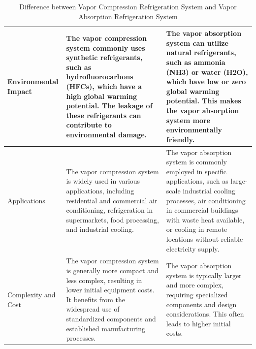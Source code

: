 \documentclass{article}
\begin{document}
\begin{table}[!htbp]
\begin{tabularx}{\linewidth}{@{}>{\hsize=0.6\hsize}X *{2}{>{\hsize=1.2\hsize}X}@{}}
    \hline 
    Environmental Impact & The vapor compression system commonly uses synthetic refrigerants, such as hydrofluorocarbons (HFCs), which have a high global warming potential. The leakage of these refrigerants can contribute to environmental damage. & The vapor absorption system can utilize natural refrigerants, such as ammonia (NH3) or water (H2O), which have low or zero global warming potential. This makes the vapor absorption system more environmentally friendly.\\
    \hline 
    Applications & The vapor compression system is widely used in various applications, including residential and commercial air conditioning, refrigeration in supermarkets, food processing, and industrial cooling. & The vapor absorption system is commonly employed in specific applications, such as large-scale industrial cooling processes, air conditioning in commercial buildings with waste heat available, or cooling in remote locations without reliable electricity supply. \\
    \hline 
    Complexity and Cost & The vapor compression system is generally more compact and less complex, resulting in lower initial equipment costs. It benefits from the widespread use of standardized components and established manufacturing processes. & The vapor absorption system is typically larger and more complex, requiring specialized components and design considerations. This often leads to higher initial costs. \\ 
    \hline
  \end{tabularx}
  \caption{Difference between Vapor Compression Refrigeration System and Vapor Absorption Refrigeration System }
  \label{tab:full-width-table}
\end{table}

\pagebreak
\end{document}

